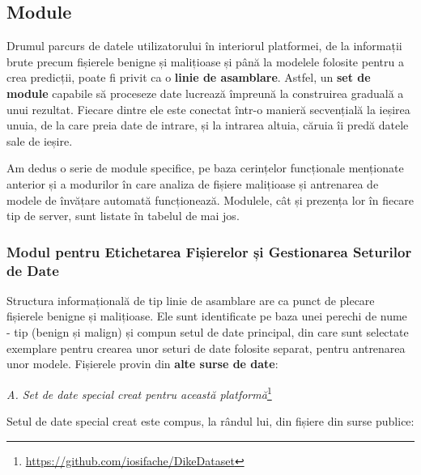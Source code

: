 \documentclass[../../main.tex]{subfiles}
\begin{document}
\subsection{Module}

Drumul parcurs de datele utilizatorului în interiorul platformei, de la informații brute precum fișierele benigne și malițioase și până la modelele folosite pentru a crea predicții, poate fi privit ca o \textbf{linie de asamblare}. Astfel, un \textbf{set de module} capabile să proceseze date lucrează împreună la construirea graduală a unui rezultat. Fiecare dintre ele este conectat într-o manieră secvențială la ieșirea unuia, de la care preia date de intrare, și la intrarea altuia, căruia îi predă datele sale de ieșire.

Am dedus o serie de module specifice, pe baza cerințelor funcționale mențio\-nate anterior și a modurilor în care analiza de fișiere malițioase și antrenarea de modele de învățare automată funcționează. Modulele, cât și prezența lor în fiecare tip de server, sunt listate în tabelul de mai jos.

\begin{landscape}
    \vspace*{\fill}
    
    \vspace*{\fill}
\end{landscape}

\subsubsection{Modul pentru Etichetarea Fișierelor și Gestionarea Seturilor de Date}

Structura informațională de tip linie de asamblare are ca punct de plecare fișierele benigne și malițioase. Ele sunt identificate pe baza unei perechi de nume - tip (benign și malign) și compun setul de date principal, din care sunt selectate exemplare pentru crearea unor seturi de date folosite separat, pentru antrenarea unor modele. Fișierele provin din \textbf{alte surse de date}:

\vspace{0.3cm}

\textit{A. Set de date special creat pentru această platformă}\footnote{\href{https://github.com/iosifache/DikeDataset}{https://github.com/iosifache/DikeDataset}}

Setul de date special creat este compus, la rândul lui, din fișiere din surse publice:
\end{document}
